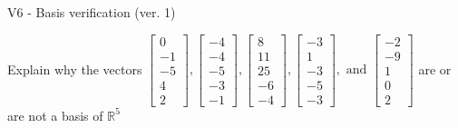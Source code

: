 \begin{exercise}
  \begin{exerciseTitle}V6 - Basis verification (ver. 1)\end{exerciseTitle}
  \begin{exerciseStatement}
    Explain why the vectors \(\left[\begin{array}{r}
0 \\
-1 \\
-5 \\
4 \\
2
\end{array}\right] , \left[\begin{array}{r}
-4 \\
-4 \\
-5 \\
-3 \\
-1
\end{array}\right] , \left[\begin{array}{r}
8 \\
11 \\
25 \\
-6 \\
-4
\end{array}\right] , \left[\begin{array}{r}
-3 \\
1 \\
-3 \\
-5 \\
-3
\end{array}\right] , \text{ and } \left[\begin{array}{r}
-2 \\
-9 \\
1 \\
0 \\
2
\end{array}\right]\) are or are not a basis of \(\mathbb{R}^5\)	



\end{exerciseStatement}
\end{exercise}

